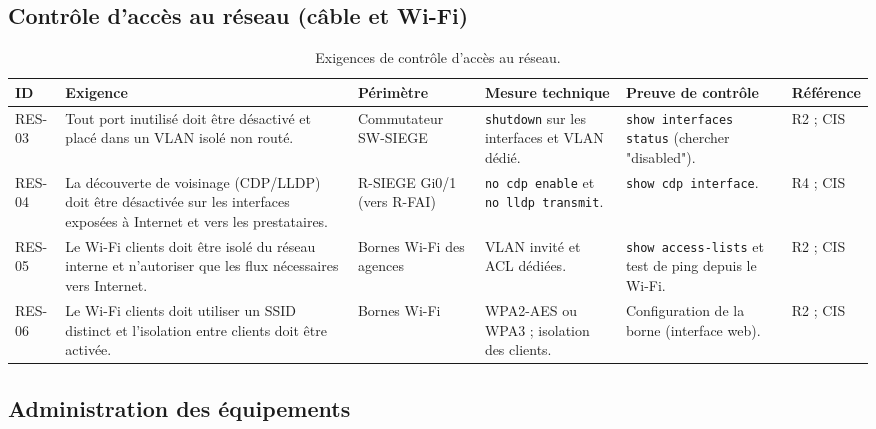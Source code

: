 \documentclass[11pt,a4paper]{article}
\begin{document}
	\subsection{Contrôle d'accès au réseau (câble et Wi-Fi)}
	
	\scriptsize
	\begin{longtable}{p{0.7cm} p{3.95cm} p{1.95cm} p{3.2cm} p{3.0cm} p{1.8cm}}
		\caption{Exigences de contrôle d'accès au réseau.}\\
		\hline
		\textbf{ID} & \textbf{Exigence} & \textbf{Périmètre} & \textbf{Mesure technique} & \textbf{Preuve de contrôle} & \textbf{Référence}\\
		\hline
		\endhead
		RES-03 & Tout port inutilisé doit être désactivé et placé dans un VLAN isolé non routé. & Commutateur SW-SIEGE & \texttt{shutdown} sur les interfaces et VLAN dédié. & \texttt{show interfaces status} (chercher "disabled"). & R2 ; CIS\\
		\hline
		RES-04 & La découverte de voisinage (CDP/LLDP) doit être désactivée sur les interfaces exposées à Internet et vers les prestataires. & R-SIEGE Gi0/1 (vers R-FAI) & \texttt{no cdp enable} et \texttt{no lldp transmit}. & \texttt{show cdp interface}. & R4 ; CIS\\
		\hline
		RES-05 & Le Wi-Fi clients doit être isolé du réseau interne et n'autoriser que les flux nécessaires vers Internet. & Bornes Wi-Fi des agences & VLAN invité et ACL dédiées. & \texttt{show access-lists} et test de ping depuis le Wi-Fi. & R2 ; CIS\\
		\hline
		RES-06 & Le Wi-Fi clients doit utiliser un SSID distinct et l'isolation entre clients doit être activée. & Bornes Wi-Fi & WPA2-AES ou WPA3 ; isolation des clients. & Configuration de la borne (interface web). & R2 ; CIS\\
		\hline
	\end{longtable}
	\normalsize
	
	\subsection{Administration des équipements}
	
\end{document}
